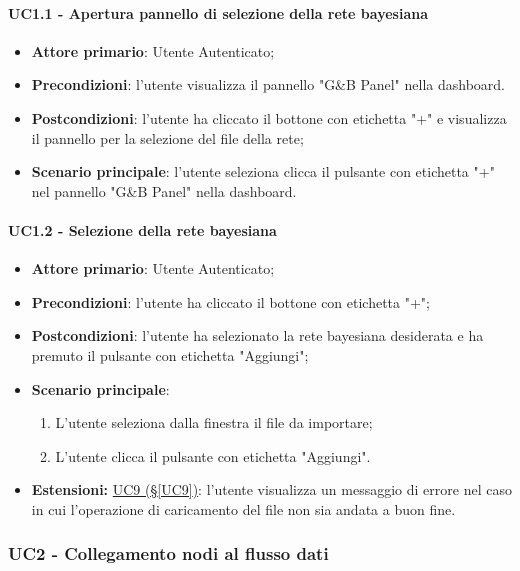\paragraph{UC1.1 - Apertura pannello di selezione della rete bayesiana}\label{UC1.1}
\begin{itemize}
	\item \textbf{Attore primario}: Utente Autenticato; 
	\item \textbf{Precondizioni}: l'utente visualizza il pannello "G\&B Panel" nella dashboard.
	\item \textbf{Postcondizioni}: l'utente ha cliccato il bottone con etichetta "+" e visualizza il pannello per la selezione del file della rete;
	\item \textbf{Scenario principale}: l'utente seleziona clicca il pulsante con etichetta "+" nel pannello "G\&B Panel" nella dashboard.
\end{itemize}


\paragraph{UC1.2 - Selezione della rete bayesiana}\label{UC1.2}
\begin{itemize}
	\item \textbf{Attore primario}: Utente Autenticato;
	\item \textbf{Precondizioni}: l'utente ha cliccato il bottone con etichetta "+";
	\item \textbf{Postcondizioni}: l'utente ha selezionato la rete bayesiana desiderata e ha premuto il pulsante con etichetta "Aggiungi";
	\item \textbf{Scenario principale}:
	\begin{enumerate}
		\item L'utente seleziona dalla finestra il file da importare;
		\item L'utente clicca il pulsante con etichetta "Aggiungi".
	\end{enumerate}
	\item \textbf{Estensioni:} \hyperref[UC9]{UC9 (§\ref*{UC9})}: l'utente visualizza un messaggio di errore nel caso in cui l'operazione di caricamento del file non sia andata a buon fine.
\end{itemize}

\pagebreak

\subsubsection{UC2 - Collegamento nodi al flusso dati}\label{UC2}


